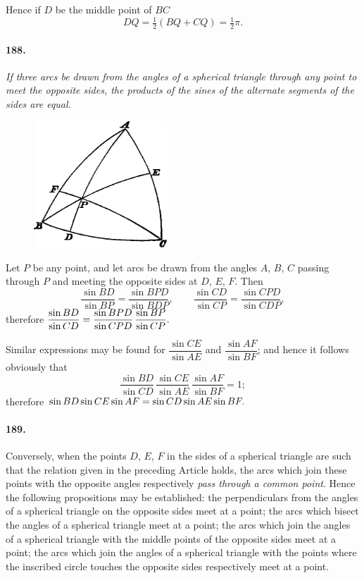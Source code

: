 \documentclass{book}[2004/02/16]
\begin{document}
\begin{mainmatter}
\begin{spacing}{1.3}
Hence if $D$ be the middle point of $BC$
\[
DQ = \tfrac{1}{2} (BQ + CQ) = \tfrac{1}{2} \pi.
\]

\paragraph{188.} \textit{If three arcs be drawn from the angles of a spherical
triangle through any point to meet the opposite sides, the products
of the sines of the alternate segments of the sides are equal.}
\begin{figure}[htp]
\centering
\includegraphics[width=5.0cm]{images/148fc}
\end{figure}

Let $P$ be any point, and let arcs be drawn from the angles
$A$, $B$, $C$ passing through $P$ and meeting the opposite sides at
$D$, $E$, $F$. Then
\[
  \frac{\sin BD}{\sin BP} = \frac{\sin BPD}{\sin BDP},\qquad
  \frac{\sin CD}{\sin CP} = \frac{\sin CPD}{\sin CDP},
\]
therefore
$\hfill\displaystyle
  \frac{\sin BD }{\sin CD }
= \frac{\sin BPD}{\sin CPD}\,
  \frac{\sin BP }{\sin CP }.
\hfill\phantom{therefore }$

Similar expressions may be found for $\dfrac{\sin CE}{\sin AE}$ and $\dfrac{\sin AF}{\sin BF}$;
and hence it follows obviously that
\[
  \dfrac{\sin BD}{\sin CD}\,
  \dfrac{\sin CE}{\sin AE}\,
  \dfrac{\sin AF}{\sin BF} = 1;
\]
therefore
$\hfill
\sin BD \sin CE \sin AF= \sin CD \sin AE \sin BF.
\hfill\phantom{therefore }$

\paragraph{189.} Conversely, when the points $D$, $E$, $F$ in the sides of a
spherical triangle are such that the relation given in the preceding
Article holds, the arcs which join these points with the opposite
angles respectively \textit{pass through a common point}. Hence the
following propositions may be established: the perpendiculars
from the angles of a spherical triangle on the opposite sides
meet at a point; the arcs which bisect the angles of a spherical
triangle meet at a point; the arcs which join the angles of a
spherical triangle with the middle points of the opposite sides
meet at a point; the arcs which join the angles of a spherical
triangle with the points where the inscribed circle touches the
opposite sides respectively meet at a point.


\end{spacing}
\end{mainmatter}
\end{document}
